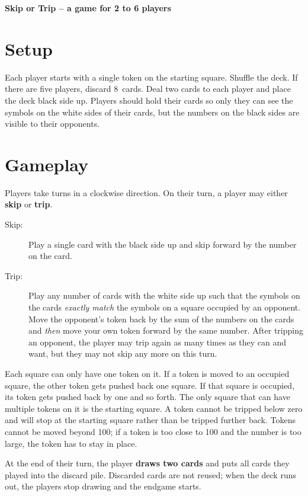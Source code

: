 \documentclass{article}
\begin{document}
{\center\LARGE\textbf{Skip or Trip -- a game for 2 to 6 players}}

\section*{Setup}

Each player starts with a single token on the starting square. Shuffle the deck. If there are five players, discard  8~cards. Deal two cards to each player and place the deck black side up. Players should hold their cards so only they can see the symbols on the white sides of their cards, but the numbers on the black sides are visible to their opponents.

\section*{Gameplay}

Players take turns in a clockwise direction. On their turn, a player may either \textbf{skip} or \textbf{trip}.

\begin{description}

\item[Skip:] Play a single card with the black side up and skip forward by the number on the card.

\item[Trip:] Play any number of cards with the white side up such that the symbols on the cards \textit{exactly match} the symbols on a square occupied by an opponent. Move the opponent's token back by the sum of the numbers on the cards and \textit{then} move your own token forward by the same number. After tripping an opponent, the player may trip again as many times as they can and want, but they may not skip any more on this turn.

\end{description}

Each square can only have one token on it. If a token is moved to an occupied square, the other token gets pushed back one square. If that square is occupied, its token gets pushed back by one and so forth. The only square that can have multiple tokens on it is the starting square. A token cannot be tripped below zero and will stop at the starting square rather than be tripped further back. Tokens cannot be moved beyond 100; if a token is too close to 100 and the number is too large, the token has to stay in place. 

At the end of their turn, the player \textbf{draws two cards} and puts all cards they played into the discard pile. Discarded cards are not reused; when the deck runs out, the players stop drawing and the endgame starts.
 
\end{document}
